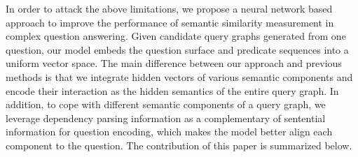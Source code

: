 


In order to attack the above limitations, we propose a neural network based 
approach to improve the performance of semantic similarity measurement
in complex question answering.
Given candidate query graphs generated from one question,
our model embeds the question surface and predicate sequences into a uniform 
vector space.
The main difference between our approach and previous methods is that
we integrate hidden vectors of various semantic components
and encode their interaction as the hidden semantics of the entire query graph.
In addition, to cope with different semantic components of a query graph,
we leverage dependency parsing information as a complementary of 
sentential information for question encoding,
which makes the model better align each component to the question.
The contribution of this paper is summarized below.

